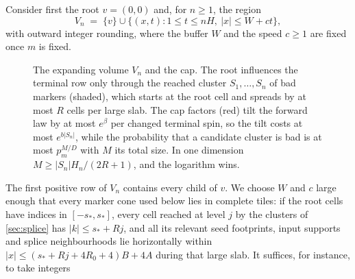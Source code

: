 \documentclass[11pt]{article}
\theoremstyle{plain}
\theoremstyle{definition}
\theoremstyle{remark}
\begin{document}
Consider first the root $v=(0,0)$ and, for $n\ge1$, the region
\begin{equation}
V_n\;=\;\{v\}\cup\bigl\{(x,t):1\le t\le nH,\ |x|\le W+ct\bigr\},
\label{eq:Vn}
\end{equation}
with outward integer rounding, where the buffer $W$ and the speed $c\ge1$ are fixed once $m$ is fixed.

\begin{figure}[t]
\centering
{}
\caption{The expanding volume $V_n$ and the cap. The root influences the terminal row only through the reached cluster $S_1,\dots,S_n$ of bad markers (shaded), which starts at the root cell and spreads by at most $R$ cells per large slab. The cap factors (red) tilt the forward law by at most $e^{\beta}$ per changed terminal spin, so the tilt costs at most $e^{b|S_n|}$, while the probability that a candidate cluster is bad is at most $p_m^{M/D}$ with $M$ its total size. In one dimension $M\ge |S_n|H_n/(2R+1)$, and the logarithm wins.}
\label{fig:cap}
\end{figure} The first positive row of $V_n$ contains every child of $v$. We choose $W$ and $c$ large enough that every marker cone used below lies in complete tiles: if the root cells have indices in $[-s_*,s_*]$, every cell reached at level $j$ by the clusters of \cref{sec:splice} has $|k|\le s_*+Rj$, and all its relevant seed footprints, input supports and splice neighbourhoods lie horizontally within $|x|\le(s_*+Rj+4R_0+4)B+4A$ during that large slab. It suffices, for instance, to take integers
\end{document}

